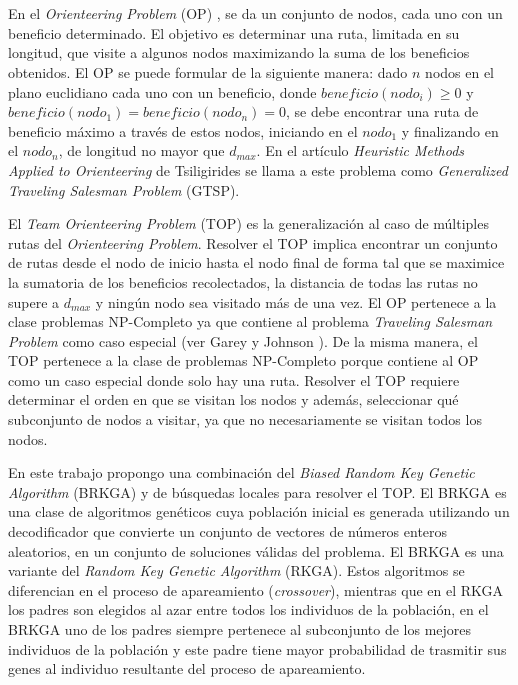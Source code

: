 
\chapter*{\tituloAbstractEs}

\noindent En el \textit{Orienteering Problem} (OP) \cite{Tsiligirides}, se da un conjunto de nodos, cada uno con un beneficio determinado. El objetivo es determinar una ruta, limitada en su longitud, que visite a algunos nodos maximizando la suma de los beneficios obtenidos. El OP se puede formular de la siguiente manera: dado $n$ nodos en el plano euclidiano cada uno con un beneficio, donde $beneficio(nodo_i) \geq 0$ y $beneficio(nodo_1) = beneficio(nodo_n) = 0$, se debe encontrar una ruta de beneficio máximo a través de estos nodos, iniciando en el $nodo_1$ y finalizando en el $nodo_n$, de longitud no mayor que $d_{max}$. En el artículo \textit{Heuristic Methods Applied to Orienteering} de Tsiligirides \cite{Tsiligirides} se llama a este problema como \textit{Generalized Traveling Salesman Problem} (GTSP).

\bigskip

El \textit{Team Orienteering Problem} (TOP) \cite{ChaoGoldenWasil} es la generalización al caso de múltiples rutas del \textit{Orienteering Problem}. Resolver el TOP implica encontrar un conjunto de rutas desde el nodo de inicio hasta el nodo final de forma tal que se maximice la sumatoria de los beneficios recolectados, la distancia de todas las rutas no supere a $d_{max}$ y ningún nodo sea visitado más de una vez. El OP pertenece a la clase problemas NP-Completo ya que contiene al problema \textit{Traveling Salesman Problem} como caso especial (ver Garey y Johnson \cite{GareyJohnson}). De la misma manera, el TOP pertenece a la clase de problemas NP-Completo porque contiene al OP como un caso especial donde solo hay una ruta. Resolver el TOP requiere determinar el orden en que se visitan los nodos y además, seleccionar qué subconjunto de nodos a visitar, ya que no necesariamente se visitan todos los nodos.

\bigskip

En este trabajo propongo una combinación del \textit{Biased Random Key Genetic Algorithm} (BRKGA) \cite{Bean} y de búsquedas locales para resolver el TOP. El BRKGA es una clase de algoritmos genéticos cuya población inicial es generada utilizando un decodificador que convierte un conjunto de vectores de números enteros aleatorios, en un conjunto de soluciones válidas del problema. El BRKGA es una variante del \textit{Random Key Genetic Algorithm} (RKGA). Estos algoritmos se diferencian en el proceso de apareamiento (\textit{crossover}), mientras que en el RKGA los padres son elegidos al azar entre todos los individuos de la población, en el BRKGA uno de los padres siempre pertenece al subconjunto de los mejores individuos de la población y este padre tiene mayor probabilidad de trasmitir sus genes al individuo resultante del proceso de apareamiento.

